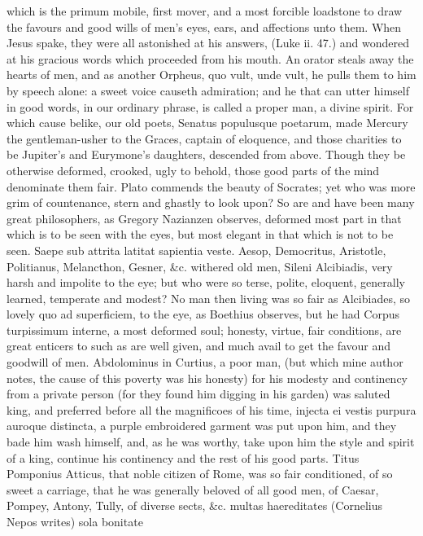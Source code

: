 {which is the primum mobile, first mover, and a most forcible loadstone
to draw the favours and good wills of men's eyes, ears, and affections
unto them. When Jesus spake, they were all astonished at his answers,
(Luke ii. 47.) and wondered at his gracious words which proceeded from
his mouth. An orator steals away the hearts of men, and as another
Orpheus, quo vult, unde vult, he pulls them to him by speech alone: a
sweet voice causeth admiration; and he that can utter himself in good
words, in our ordinary phrase, is called a proper man, a divine spirit.
For which cause belike, our old poets, Senatus populusque poetarum,
made Mercury the gentleman-usher to the Graces, captain of eloquence,
and those charities to be Jupiter's and Eurymone's daughters, descended
from above. Though they be otherwise deformed, crooked, ugly to behold,
those good parts of the mind denominate them fair. Plato commends the
beauty of Socrates; yet who was more grim of countenance, stern and
ghastly to look upon? So are and have been many great philosophers, as
Gregory Nazianzen observes, deformed most part in that which is
to be seen with the eyes, but most elegant in that which is not to be
seen. Saepe sub attrita latitat sapientia veste. Aesop, Democritus,
Aristotle, Politianus, Melancthon, Gesner, \&c. withered old men, Sileni
Alcibiadis, very harsh and impolite to the eye; but who were so terse,
polite, eloquent, generally learned, temperate and modest? No man then
living was so fair as Alcibiades, so lovely quo ad superficiem, to the
eye, as Boethius observes, but he had Corpus turpissimum interne,
a most deformed soul; honesty, virtue, fair conditions, are great
enticers to such as are well given, and much avail to get the favour
and goodwill of men. Abdolominus in Curtius, a poor man, (but which
mine author notes, the cause of this poverty was his honesty) for
his modesty and continency from a private person (for they found him
digging in his garden) was saluted king, and preferred before all the
magnificoes of his time, injecta ei vestis purpura auroque distincta, a
purple embroidered garment was put upon him, and they bade him
wash himself, and, as he was worthy, take upon him the style and spirit
of a king, continue his continency and the rest of his good parts.
Titus Pomponius Atticus, that noble citizen of Rome, was so fair
conditioned, of so sweet a carriage, that he was generally beloved of
all good men, of Caesar, Pompey, Antony, Tully, of diverse sects, \&c.
multas haereditates (Cornelius Nepos writes) sola bonitate
}
